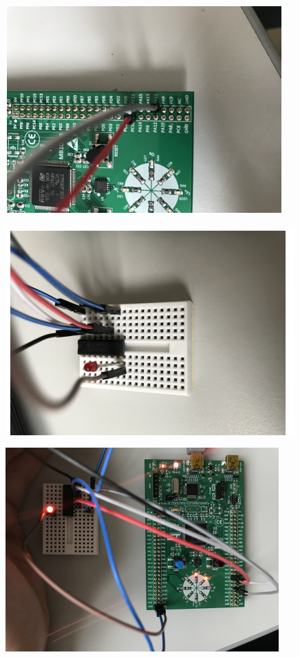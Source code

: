 \begin{minipage}{\linewidth}
	\centering
	\includegraphics[width=0.8\linewidth]{images/aufbau2}
\end{minipage}

\begin{minipage}{\linewidth}
	\centering
	\includegraphics[width=0.8\linewidth]{images/aufbau3}
\end{minipage}

\begin{minipage}{\linewidth}
	\centering
	\includegraphics[width=0.8\linewidth]{images/aufbau4}
\end{minipage}

